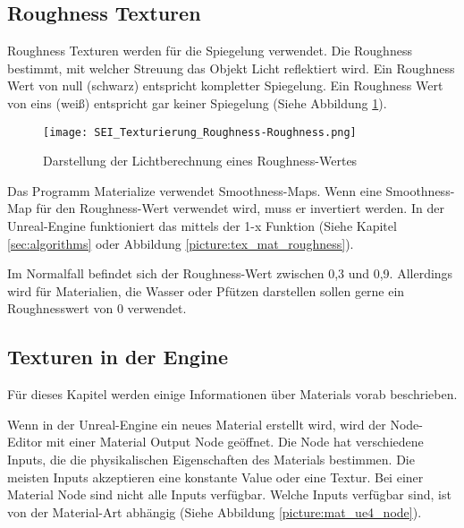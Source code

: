 \subsection{Roughness Texturen}
\label{sec:tex_roughness}

Roughness Texturen werden für die Spiegelung verwendet. Die Roughness bestimmt, mit welcher Streuung das Objekt Licht
reflektiert wird. Ein Roughness Wert von null (schwarz) entspricht kompletter Spiegelung. Ein Roughness Wert von eins
(weiß) entspricht gar keiner Spiegelung (Siehe Abbildung \ref{picture:roughness_illustration}).

\begin{figure}[H]
    \centering
    \texttt{[image: SEI\_Texturierung\_Roughness-Roughness.png]}
    \caption{Darstellung der Lichtberechnung eines Roughness-Wertes}
    \label{picture:roughness_illustration}
\end{figure}


Das Programm Materialize verwendet Smoothness-Maps. Wenn eine Smoothness-Map für den Roughness-Wert verwendet wird,
muss er invertiert werden. In der Unreal-Engine funktioniert das mittels der 1-x Funktion (Siehe
Kapitel \ref{sec:algorithms} oder Abbildung \ref{picture:tex_mat_roughness}).

Im Normalfall befindet sich der Roughness-Wert zwischen 0,3 und 0,9. Allerdings wird für Materialien, die Wasser oder
Pfützen darstellen sollen gerne ein Roughnesswert von 0 verwendet.

\subsection{Texturen in der Engine}
\label{sec:tex_inside_engine}

Für dieses Kapitel werden einige Informationen über Materials vorab beschrieben.


Wenn in der Unreal-Engine ein neues Material erstellt wird, wird der Node-Editor\citep{ue:node_introduction} mit einer
Material Output Node geöffnet. Die Node hat verschiedene Inputs, die die physikalischen Eigenschaften des Materials
bestimmen. Die meisten Inputs akzeptieren eine konstante Value oder eine Textur. Bei einer Material Node sind nicht
alle Inputs verfügbar. Welche Inputs verfügbar sind, ist von der Material-Art abhängig (Siehe
Abbildung \ref{picture:mat_ue4_node}).

